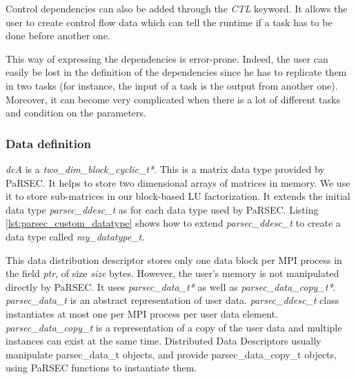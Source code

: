Control dependencies can also be added through the \textit{CTL} keyword.
It allows the user to create control flow data which can tell the runtime if a task has to be done before another one.

\begin{figure}[h]

\end{figure}

This way of expressing the dependencies is error-prone.
Indeed, the user can easily be lost in the definition of the dependencies since he has to replicate them in two tasks (for instance, the input of a task is the output from another one).
Moreover, it can become very complicated when there is a lot of different tasks and condition on the parameters.

\subsubsection{Data definition}
\textit{dcA} is a \textit{two\_dim\_block\_cyclic\_t*}.
This is a matrix data type provided by PaRSEC.
It helps to store two dimensional arrays of matrices in memory.
We use it to store sub-matrices in our block-based LU factorization.
It extends the initial data type \textit{parsec\_ddesc\_t} as for each data type used by PaRSEC.
Listing \ref{lst:parsec_custom_datatype} shows how to extend \textit{parsec\_ddesc\_t} to create a data type called \textit{my\_datatype\_t}.

This data distribution descriptor stores only one data block per MPI process in the field \textit{ptr}, of size \textit{size} bytes.
However, the user's memory is not manipulated directly by PaRSEC.
It uses \textit{parsec\_data\_t*} as well as \textit{parsec\_data\_copy\_t*}.
\textit{parsec\_data\_t} is an abstract representation of user data.
\textit{parsec\_ddesc\_t} class instantiates at most one per MPI process per user data element.
\textit{parsec\_data\_copy\_t} is a representation of a copy of the user data and multiple instances can exist at the same time.
Distributed Data Descriptors usually manipulate parsec\_data\_t objects, and provide parsec\_data\_copy\_t objects, using PaRSEC functions to instantiate them.


\begin{figure}[h]

\end{figure}

